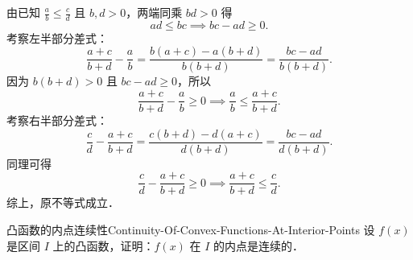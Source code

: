 \begin{myproof}
    由已知 $\frac{a}{b} \leqslant \frac{c}{d}$ 且 $b, d > 0$，两端同乘 $bd > 0$ 得
    \begin{equation}
        ad \leqslant bc \implies bc - ad \geqslant 0.
    \end{equation}
    考察左半部分差式：
    \begin{equation}
        \frac{a+c}{b+d} - \frac{a}{b} = \frac{b(a+c) - a(b+d)}{b(b+d)} = \frac{bc - ad}{b(b+d)}.
    \end{equation}
    因为 $b(b+d) > 0$ 且 $bc - ad \geqslant 0$，所以
    \begin{equation}
        \frac{a+c}{b+d} - \frac{a}{b} \geqslant 0 \implies \frac{a}{b} \leqslant \frac{a+c}{b+d}.
    \end{equation}
    考察右半部分差式：
    \begin{equation}
        \frac{c}{d} - \frac{a+c}{b+d} = \frac{c(b+d) - d(a+c)}{d(b+d)} = \frac{bc - ad}{d(b+d)}.
    \end{equation}
    同理可得
    \begin{equation}
        \frac{c}{d} - \frac{a+c}{b+d} \geqslant 0 \implies \frac{a+c}{b+d} \leqslant \frac{c}{d}.
    \end{equation}
    综上，原不等式成立．
\end{myproof}

\begin{problem}{凸函数的内点连续性}{Continuity-Of-Convex-Functions-At-Interior-Points}
    设 $f(x)$ 是区间 $I$ 上的凸函数，证明：$f(x)$ 在 $I$ 的内点是连续的．
\end{problem}

